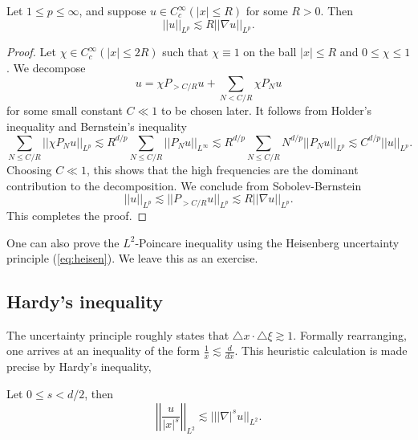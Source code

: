 \begin{theorem}
	Let $1 \leq p \leq \infty$, and suppose $u \in C^\infty_c (|x| \leq R)$ for some $R > 0$. Then 
		\[ ||u||_{L^p} \lesssim R ||\nabla u||_{L^p}. \]
\end{theorem}

\begin{proof}
	Let $\chi \in C^\infty_c (|x| \leq 2R)$ such that $\chi \equiv 1$ on the ball $|x| \leq R$ and $0 \leq \chi \leq 1$. We decompose
		\[u = \chi P_{> C/R} u + \sum_{N < C/R} \chi P_N u \]
	for some small constant $C \ll 1$ to be chosen later. It follows from Holder's inequality and Bernstein's inequality
		\[  \sum_{N \leq C/R} ||\chi P_N u||_{L^p} \lesssim R^{d/p} \sum_{N \leq C/R} ||P_N u||_{L^\infty} \lesssim R^{d/p} \sum_{N \leq C/R} N^{d/p} ||P_N u||_{L^p} \lesssim C^{d/p} ||u||_{L^p}.   \]	
	Choosing $C \ll 1$, this shows that the high frequencies are the dominant contribution to the decomposition. We conclude from Sobolev-Bernstein
		\[ ||u||_{L^p} \lesssim ||P_{> C/R} u||_{L^p} \lesssim R ||\nabla u||_{L^p}. \]
	This completes the proof. 
\end{proof}

\begin{remark}
	One can also prove the $L^2$-Poincare inequality using the Heisenberg uncertainty principle (\ref{eq:heisen}). We leave this as an exercise. 
\end{remark}

\subsection{Hardy's inequality}

The uncertainty principle roughly states that $\triangle x \cdot \triangle \xi \gtrsim 1$. Formally rearranging, one arrives at an inequality of the form $\tfrac{1}{x} \lesssim \tfrac{d}{dx}$. This heuristic calculation is made precise by Hardy's inequality, 

\begin{theorem}
	Let $0 \leq s < d/2$, then 
		\[ \left|\left| \frac{u}{|x|^s} \right|\right|_{L^2} \lesssim |||\nabla|^s u||_{L^2}. \]
\end{theorem}

